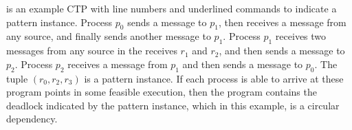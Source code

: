  is an example CTP with line numbers and underlined commands to indicate a pattern instance. Process $p_0$ sends a message to $p_1$, then receives a message from any source, and finally sends another message to $p_1$. Process $p_1$ receives two messages from any source in the receives $r_1$ and $r_2$, and then sends a message to $p_2$. Process $p_2$ receives a message from $p_1$ and then sends a message to $p_0$. The tuple $(r_0,r_2,r_3)$ is a pattern instance. If each process is able to arrive at these program points in some feasible execution, then the program contains the deadlock indicated by the pattern instance, which in this example, is a circular dependency.
